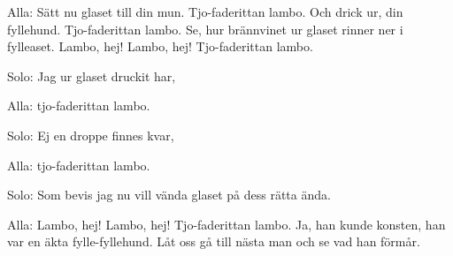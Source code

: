 


	
\beginverse*		%
Alla: Sätt nu glaset till din mun.
      Tjo-faderittan lambo.
      Och drick ur, din fyllehund.
      Tjo-faderittan lambo.
      Se, hur brännvinet ur glaset
      rinner ner i fylleaset.
      Lambo, hej! Lambo, hej! Tjo-faderittan lambo.

Solo: Jag ur glaset druckit har,

Alla: tjo-faderittan lambo.

Solo: Ej en droppe finnes kvar,

Alla: tjo-faderittan lambo.

Solo: Som bevis jag nu vill vända
      glaset på dess rätta ända.

Alla: Lambo, hej! Lambo, hej! Tjo-faderittan lambo.
      Ja, han kunde konsten, han var en äkta fylle-fyllehund.
      Låt oss gå till nästa man och se vad han förmår.
\endverse			%
\endsong			%
